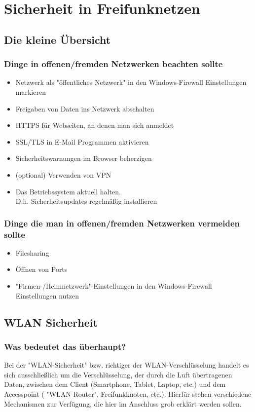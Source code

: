 \section{Sicherheit in Freifunknetzen}
\subsection{Die kleine Übersicht}

\subsubsection{Dinge in offenen/fremden Netzwerken beachten sollte}
\begin{itemize}
\item Netzwerk als "öffentliches Netzwerk" in den Windows-Firewall Einstellungen\\ markieren
\item Freigaben von Daten ins Netzwerk abschalten
\item HTTPS für Webseiten, an denen man sich anmeldet
\item SSL/TLS in E-Mail Programmen aktivieren
\item Sicherheitswarnungen im Browser beherzigen
\item (optional) Verwenden von VPN
\item Das Betriebssystem aktuell halten. \\D.h. Sicherheitsupdates regelmäßig installieren
\end{itemize}

\subsubsection{Dinge die man in offenen/fremden Netzwerken vermeiden sollte}

\begin{itemize}
\item Filesharing
\item Öffnen von Ports
\item "Firmen-/Heimnetzwerk"-Einstellungen in den Windows-Firewall Einstellungen nutzen
\end{itemize}

\subsection{WLAN Sicherheit}
\subsubsection{Was bedeutet das überhaupt?}
Bei der  "WLAN-Sicherheit"  bzw. richtiger der WLAN-Verschlüsselung handelt es 
sich ausschließlich um die Verschlüsselung, der durch die Luft übertragenen 
Daten, zwischen dem Client (Smartphone, Tablet, Laptop, etc.) und dem 
Accesspoint ( "WLAN-Router", Freifunkknoten, etc.). Hierfür stehen verschiedene 
Mechanismen zur Verfügung, die hier im Anschluss grob erklärt werden sollen.

